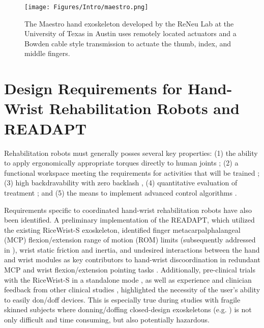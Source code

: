     \begin{figure}[!htb]
        \begin{center}
            \texttt{[image: Figures/Intro/maestro.png]}{}
            \caption{The Maestro hand exoskeleton developed by the ReNeu Lab at the University of Texas in Austin uses remotely located actuators and a Bowden cable style transmission to actuate the thumb, index, and middle fingers.}
            \label{fig:maestro}
        \end{center}
        \vspace{-1.5em}
    \end{figure}

    \section{Design Requirements for Hand-Wrist Rehabilitation Robots and READAPT} \label{sec:motivation}

    Rehabilitation robots must generally posses several key properties: (1) the ability to apply ergonomically appropriate torques directly to human joints \cite{schiele2006,esmaeili2011}; (2) a functional workspace meeting the requirements for activities that will be trained \cite{schiele2006}; (3) high backdravability with zero backlash \cite{hayward2007}, (4) quantitative evaluation of treatment \cite{esmaeili2011}; and (5) the means to implement advanced control algorithms \cite{pehlivan2015}.

    Requirements specific to coordinated hand-wrist rehabilitation robots have also been identified. A preliminary implementation of the READAPT, which utilized the existing RiceWrist-S exoskeleton\cite{pehlivan2014}, identified finger metacarpalphalangeal (MCP) flexion/extension range of motion (ROM) limits (subsequently addressed in \cite{agarwal2017}), wrist static friction and inertia, and undesired interactions between the hand and wrist modules as key contributors to hand-wrist discoordination in redundant MCP and wrist flexion/extension pointing tasks \cite{rose2015}. Additionally, pre-clinical trials with the RiceWrist-S in a standalone mode \cite{pehlivan2014}, as well as experience and clinician feedback from other clinical studies \cite{fitle2015}, highlighted the necessity of the user's ability to easily don/doff devices. This is especially true during studies with fragile skinned subjects where donning/doffing closed-design exoskeletons (e.g. \cite{pehlivan2011,pehlivan2014,martinez2013}) is not only difficult and time consuming, but also potentially hazardous.

